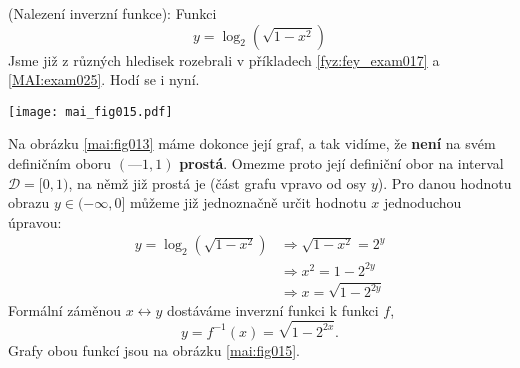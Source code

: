 \wikitextrule
\begin{example}\label{MAI:exam027}
  (Nalezení inverzní funkce): Funkci 
  \begin{equation*}
    y = \log_2(\sqrt{1-x^2})
  \end{equation*}
   Jsme již z různých hledisek rozebrali v příkladech \ref{fyz:fey_exam017} a \ref{MAI:exam025}. 
   Hodí se i nyní.

  {\centering
   \captionsetup{type=figure}
%  
   \texttt{[image: mai\_fig015.pdf]} 
  \par}
  
   Na obrázku \ref{mai:fig013} máme dokonce její graf, a tak vidíme, že \textbf{není} na svém 
   definičním oboru \((—1, 1)\) \textbf{prostá}. Omezme proto její definiční obor na interval 
   \( \mathcal{D} = [0, 1)\), na němž již prostá je (část grafu vpravo od osy \(y\)). Pro danou 
   hodnotu obrazu \(y \in (-\infty,0]\) můžeme již jednoznačně určit hodnotu \(x\) jednoduchou 
   úpravou:
   \begin{align*}
     y = \log_2(\sqrt{1-x^2}) &\Rightarrow \sqrt{1-x^2} = 2^y   \\
                              &\Rightarrow x^2 = 1 - 2^{2y}     \\
                              &\Rightarrow x = \sqrt{1 - 2^{2y}}
   \end{align*}
   Formální záměnou \(x \leftrightarrow y\) dostáváme inverzní funkci k funkci \(f\),
   \begin{equation*}
     y =f^{-1}(x) = \sqrt{1 - 2^{2x}}.
   \end{equation*}
   Grafy obou funkcí jsou na obrázku \ref{mai:fig015}.
\end{example}
















